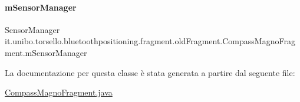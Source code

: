 \hypertarget{classit_1_1unibo_1_1torsello_1_1bluetoothpositioning_1_1fragment_1_1oldFragment_1_1CompassMagnoFragment_ae6b91ce34c58940e5f936dba964d6182_ae6b91ce34c58940e5f936dba964d6182}{}\label{classit_1_1unibo_1_1torsello_1_1bluetoothpositioning_1_1fragment_1_1oldFragment_1_1CompassMagnoFragment_ae6b91ce34c58940e5f936dba964d6182_ae6b91ce34c58940e5f936dba964d6182} 
\paragraph{\texorpdfstring{m\+Sensor\+Manager}{mSensorManager}}
{\footnotesize\ttfamily Sensor\+Manager it.\+unibo.\+torsello.\+bluetoothpositioning.\+fragment.\+old\+Fragment.\+Compass\+Magno\+Fragment.\+m\+Sensor\+Manager\hspace{0.3cm}{\ttfamily [private]}}



La documentazione per questa classe è stata generata a partire dal seguente file\+:\begin{DoxyCompactItemize}
\item 
\hyperlink{CompassMagnoFragment_8java}{Compass\+Magno\+Fragment.\+java}\end{DoxyCompactItemize}

